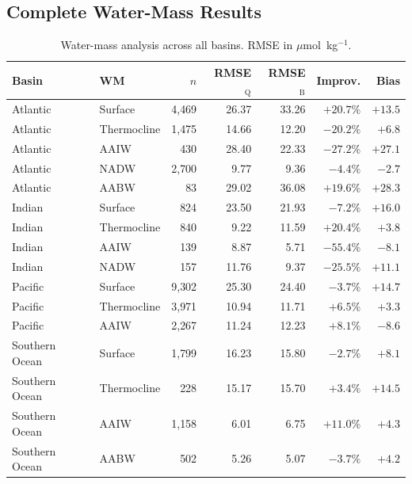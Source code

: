 \documentclass[12pt,a4paper]{article}
\begin{document}
\subsection{Complete Water-Mass Results}

\begin{table}[htbp]
\centering
\caption{Water-mass analysis across all basins. RMSE in $\mu$mol~kg$^{-1}$.}
\small
\begin{tabular}{ll rrrr r}
\toprule
\textbf{Basin} & \textbf{WM} & $n$ & RMSE$_{\text{Q}}$ & RMSE$_{\text{B}}$ & \textbf{Improv.} & \textbf{Bias} \\
\midrule
Atlantic & Surface     & 4{,}469 & 26.37 & 33.26 & $+20.7\%$ & $+13.5$ \\
Atlantic & Thermocline & 1{,}475 & 14.66 & 12.20 & $-20.2\%$ & $+6.8$ \\
Atlantic & AAIW        & 430     & 28.40 & 22.33 & $-27.2\%$ & $+27.1$ \\
Atlantic & NADW        & 2{,}700 & 9.77  & 9.36  & $-4.4\%$  & $-2.7$ \\
Atlantic & AABW        & 83      & 29.02 & 36.08 & $+19.6\%$ & $+28.3$ \\
\midrule
Indian & Surface       & 824     & 23.50 & 21.93 & $-7.2\%$  & $+16.0$ \\
Indian & Thermocline   & 840     & 9.22  & 11.59 & $+20.4\%$ & $+3.8$ \\
Indian & AAIW          & 139     & 8.87  & 5.71  & $-55.4\%$ & $-8.1$ \\
Indian & NADW          & 157     & 11.76 & 9.37  & $-25.5\%$ & $+11.1$ \\
\midrule
Pacific & Surface      & 9{,}302 & 25.30 & 24.40 & $-3.7\%$  & $+14.7$ \\
Pacific & Thermocline  & 3{,}971 & 10.94 & 11.71 & $+6.5\%$  & $+3.3$ \\
Pacific & AAIW         & 2{,}267 & 11.24 & 12.23 & $+8.1\%$  & $-8.6$ \\
\midrule
Southern Ocean & Surface     & 1{,}799 & 16.23 & 15.80 & $-2.7\%$  & $+8.1$ \\
Southern Ocean & Thermocline & 228     & 15.17 & 15.70 & $+3.4\%$  & $+14.5$ \\
Southern Ocean & AAIW        & 1{,}158 & 6.01  & 6.75  & $+11.0\%$ & $+4.3$ \\
Southern Ocean & AABW        & 502     & 5.26  & 5.07  & $-3.7\%$  & $+4.2$ \\
\bottomrule
\end{tabular}
\end{table}
\end{document}
